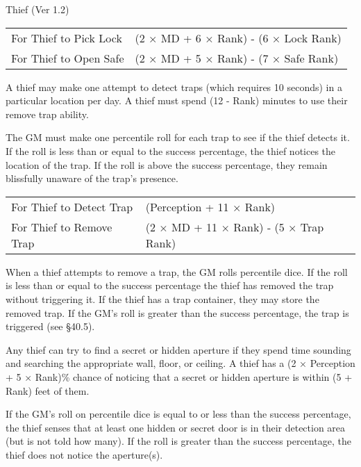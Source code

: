 \begin{Chapter}{Thief (Ver 1.2)}
\begin{tabularx}{\columnwidth}{XX}
For Thief to Pick Lock & (2 × MD + 6 × Rank)  - (6 × Lock Rank) \\
For Thief to Open Safe & (2 × MD + 5 × Rank)  - (7 × Safe Rank) \\
\end{tabularx}


A thief may make one attempt to detect traps (which requires 10
seconds) in a particular location per day. A thief must spend (12 -
Rank) minutes to use their remove trap ability.

The GM must make one percentile roll for each trap to see if the thief
detects it.  If the roll is less than or equal to the success
percentage, the thief notices the location of the trap. If the roll is
above the success percentage, they remain blissfully unaware of the
trap’s presence.

\begin{tabularx}{\columnwidth}{XX}
For Thief to Detect Trap  & (Perception + 11 × Rank) \\
For Thief to Remove Trap  & (2 × MD + 11 × Rank)  - (5 × Trap Rank) \\
\end{tabularx}

When a thief attempts to remove a trap, the GM rolls percentile
dice. If the roll is less than or equal to the success percentage the
thief has removed the trap without triggering it.  If the thief has a
trap container, they may store the removed trap.  If the GM’s roll is
greater than the success percentage, the trap is triggered (see
§40.5).


Any thief can try to find a secret or hidden aperture if they spend
time sounding and searching the appropriate wall, floor, or ceiling.
A thief has a (2 × Perception + 5 × Rank)\% chance of noticing that a
secret or hidden aperture is within (5 + Rank) feet of them.

If the GM’s roll on percentile dice is equal to or less than the
success percentage, the thief senses that at least one hidden or
secret door is in their detection area (but is not told how many).  If
the roll is greater than the success percentage, the thief does not
notice the aperture(s).



\end{Chapter}
